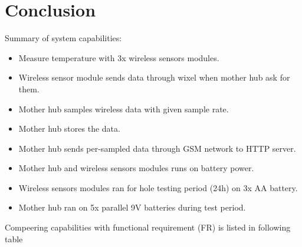 \section{Conclusion}
Summary of system capabilities:
\begin{itemize}
	\item Measure temperature with 3x wireless sensors modules.
	\item Wireless sensor module sends data through wixel when mother hub ask for them.
	\item Mother hub samples wireless data with given sample rate.
	\item Mother hub stores the data.
	\item Mother hub sends per-sampled data through GSM network to HTTP server.
	\item Mother hub and wireless sensors modules runs on battery power.
	\item Wireless sensors modules ran for hole testing period (24h) on 3x AA battery.
	\item Mother hub ran on 5x parallel 9V batteries during test period.
\end{itemize}
 
 Compeering capabilities with functional requirement (FR) is listed in following table 
 
